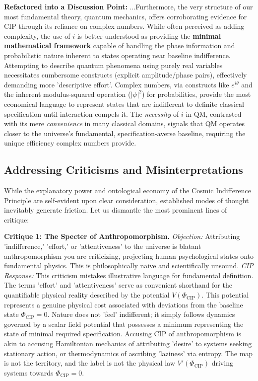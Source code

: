 \documentclass[11pt, a4paper]{article}
\newcommand{\subt}[1]{\mathrm{#1}}
\begin{document}
\textbf{Refactored into a Discussion Point:}
...Furthermore, the very structure of our most fundamental theory, quantum mechanics, offers corroborating evidence for CIP through its reliance on complex numbers. While often perceived as adding complexity, the use of $i$ is better understood as providing the \textbf{minimal mathematical framework} capable of handling the phase information and probabilistic nature inherent to states operating near baseline indifference. Attempting to describe quantum phenomena using purely real variables necessitates cumbersome constructs (explicit amplitude/phase pairs), effectively demanding more 'descriptive effort'. Complex numbers, via constructs like $e^{i\theta}$ and the inherent modulus-squared operation ($|\psi|^2$) for probabilities, provide the most economical language to represent states that are indifferent to definite classical specification until interaction compels it. The \textit{necessity} of $i$ in QM, contrasted with its mere \textit{convenience} in many classical domains, signals that QM operates closer to the universe's fundamental, specification-averse baseline, requiring the unique efficiency complex numbers provide.


\subsection{Addressing Criticisms and Misinterpretations} \label{sec:critiques}

While the explanatory power and ontological economy of the Cosmic Indifference Principle are self-evident upon clear consideration, established modes of thought inevitably generate friction. Let us dismantle the most prominent lines of critique:


\textbf{Critique 1: The Specter of Anthropomorphism.}
\textit{Objection:} Attributing 'indifference,' 'effort,' or 'attentiveness' to the universe is blatant anthropomorphism you are criticizing, projecting human psychological states onto fundamental physics. This is philosophically naive and scientifically unsound.
\textit{CIP Response:} This criticism mistakes illustrative language for fundamental definition. The terms 'effort' and 'attentiveness' serve as convenient shorthand for the quantifiable physical reality described by the potential $V(\Phi_{\subt{CIP}})$. This potential represents a genuine physical cost associated with deviations from the baseline state $\Phi_{\subt{CIP}}=0$. Nature does not 'feel' indifferent; it simply follows dynamics governed by a scalar field potential that possesses a minimum representing the state of minimal required specification. Accusing CIP of anthropomorphism is akin to accusing Hamiltonian mechanics of attributing 'desire' to systems seeking stationary action, or thermodynamics of ascribing 'laziness' via entropy. The map is not the territory, and the label is not the physical law $V'(\Phi_{\subt{CIP}})$ driving systems towards $\Phi_{\subt{CIP}}=0$.
\end{document}
